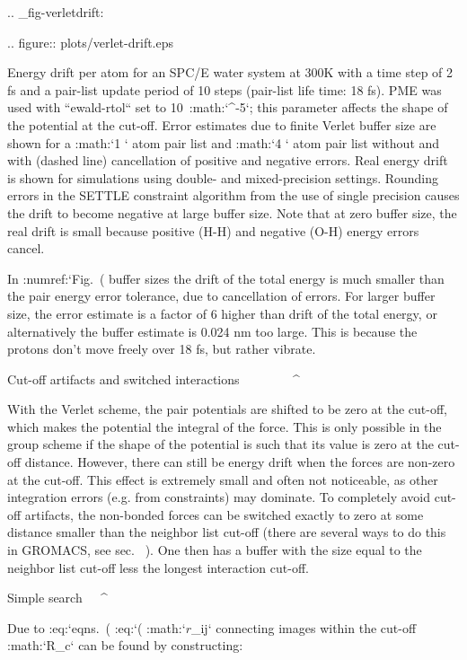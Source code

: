 .. _fig-verletdrift:

.. figure:: plots/verlet-drift.eps

   Energy drift per atom for an SPC/E water system at 300K with a
   time step of 2 fs and a pair-list update period of 10 steps
   (pair-list life time: 18 fs). PME was used with
   ``ewald-rtol`` set to 10\ :math:`^{-5}`; this parameter
   affects the shape of the potential at the cut-off. Error estimates
   due to finite Verlet buffer size are shown for a :math:`1 `
   atom pair list and :math:`4 ` atom pair list without and with
   (dashed line) cancellation of positive and negative errors. Real
   energy drift is shown for simulations using double- and
   mixed-precision settings. Rounding errors in the SETTLE constraint
   algorithm from the use of single precision causes the drift to become
   negative at large buffer size. Note that at zero buffer size, the
   real drift is small because positive (H-H) and negative (O-H) energy
   errors cancel.

In :numref:`Fig. (%
buffer sizes the drift of the total energy is much smaller than the pair
energy error tolerance, due to cancellation of errors. For larger buffer
size, the error estimate is a factor of 6 higher than drift of the total
energy, or alternatively the buffer estimate is 0.024 nm too large. This
is because the protons don’t move freely over 18 fs, but rather vibrate.

Cut-off artifacts and switched interactions
^^^^^^^^^^^^^^^^^^^^^^^^^^^^^^^^^^^^^^^^^^^

With the Verlet scheme, the pair potentials are shifted to be zero at
the cut-off, which makes the potential the integral of the force. This
is only possible in the group scheme if the shape of the potential is
such that its value is zero at the cut-off distance. However, there can
still be energy drift when the forces are non-zero at the cut-off. This
effect is extremely small and often not noticeable, as other integration
errors (e.g. from constraints) may dominate. To completely avoid cut-off
artifacts, the non-bonded forces can be switched exactly to zero at some
distance smaller than the neighbor list cut-off (there are several ways
to do this in GROMACS, see sec. 
). One
then has a buffer with the size equal to the neighbor list cut-off less
the longest interaction cut-off.

Simple search
^^^^^^^^^^^^^

Due to :eq:`eqns. (%
:eq:`(%
:math:`{{\mbox{\boldmath ${r}$}}_{ij}}` connecting images within the
cut-off :math:`R_c` can be found by constructing:

